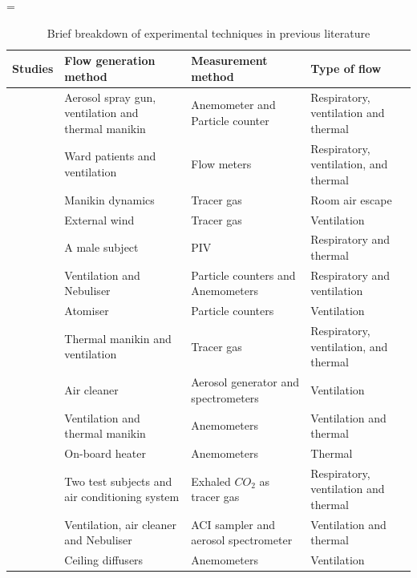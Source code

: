 \documentclass[a4paper,12pt]{elsarticle}
\begin{document}
\begin{center}
\footnotesize
\LTcapwidth=\textwidth
\begin{longtable}{|m{3.55cm}|m{3.5cm}|m{3.5cm}|m{3.5cm}|}
\caption{Brief breakdown of experimental techniques in previous literature}
\label{tab:exp}\\
    \hline
    \textbf{Studies} & \textbf{Flow generation method} & \textbf{Measurement method} & \textbf{Type of flow}\\
    \hline
    \citet{berrouk2010experimental}& Aerosol spray gun, ventilation and thermal manikin & Anemometer and Particle counter & Respiratory, ventilation and thermal\\
    \hline
    \citet{li2005role} & Ward patients and ventilation & Flow meters & Respiratory, ventilation, and thermal\\
    \hline
    \citet{saarinen2015large} & Manikin dynamics & Tracer gas & Room air escape \\
    \hline
    \citet{jiang2009investigating}& External wind & Tracer gas & Ventilation\\
    \hline
    \citet{faleiros2022tu}& A male subject & PIV & Respiratory and thermal\\
    \hline
    \citet{romano2015numerical}& Ventilation and Nebuliser & Particle counters and Anemometers & Respiratory and ventilation\\
    \hline
    \citet{quintero2022reducing}& Atomiser & Particle counters & Ventilation \\
    \hline
    \citet{hang2015potential}& Thermal manikin and ventilation & Tracer gas & Respiratory, ventilation, and thermal \\
    \hline
    \citet{jain2023numerical}& Air cleaner & Aerosol generator and spectrometers & Ventilation \\
    \hline
    \citet{li2023numerical}& Ventilation and thermal manikin & Anemometers  & Ventilation and thermal \\
    \hline
    \citet{ho2021modeling}& On-board heater & Anemometers & Thermal\\
    \hline
    \citet{deng2021control}& Two test subjects and air conditioning system & Exhaled $CO_2$ as tracer gas & Respiratory, ventilation and thermal\\
    \hline
    \citet{oksanen2022combining}& Ventilation, air cleaner and Nebuliser & ACI sampler and aerosol spectrometer & Ventilation and thermal\\
    \hline
    \citet{arpino2023cfd}& Ceiling diffusers & Anemometers & Ventilation \\

\end{longtable}
\end{center}
\end{document}
